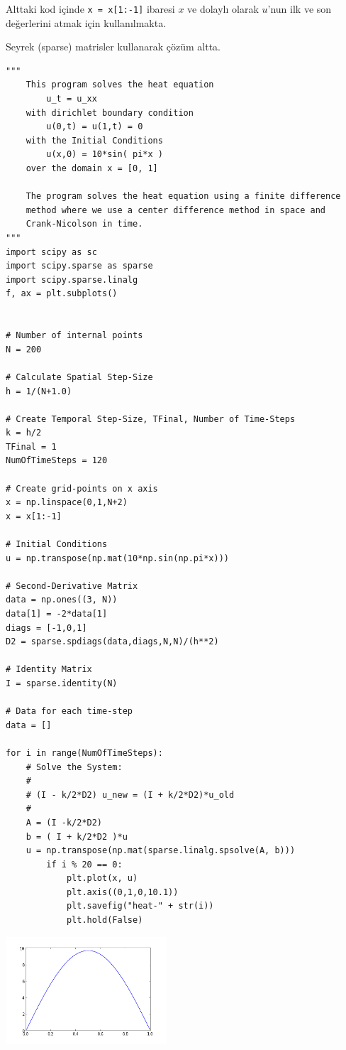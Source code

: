 \documentclass[12pt,fleqn]{article}\usepackage{../../common}
\begin{document}
Alttaki kod içinde \verb!x = x[1:-1]! ibaresi $x$ ve dolaylı
olarak $u$'nun ilk ve son değerlerini atmak için kullanılmakta.

Seyrek (sparse) matrisler kullanarak çözüm altta.

\begin{verbatim}
"""
	This program solves the heat equation
		u_t = u_xx
	with dirichlet boundary condition
		u(0,t) = u(1,t) = 0
	with the Initial Conditions
		u(x,0) = 10*sin( pi*x )
	over the domain x = [0, 1]
 
	The program solves the heat equation using a finite difference
	method where we use a center difference method in space and
	Crank-Nicolson in time.
"""
import scipy as sc
import scipy.sparse as sparse
import scipy.sparse.linalg
f, ax = plt.subplots()

 
# Number of internal points
N = 200
 
# Calculate Spatial Step-Size
h = 1/(N+1.0)
 
# Create Temporal Step-Size, TFinal, Number of Time-Steps
k = h/2
TFinal = 1
NumOfTimeSteps = 120
 
# Create grid-points on x axis
x = np.linspace(0,1,N+2)
x = x[1:-1]

# Initial Conditions
u = np.transpose(np.mat(10*np.sin(np.pi*x)))
 
# Second-Derivative Matrix
data = np.ones((3, N))
data[1] = -2*data[1]
diags = [-1,0,1]
D2 = sparse.spdiags(data,diags,N,N)/(h**2)

# Identity Matrix
I = sparse.identity(N)
 
# Data for each time-step
data = []
 
for i in range(NumOfTimeSteps):
	# Solve the System: 
	#
	# (I - k/2*D2) u_new = (I + k/2*D2)*u_old
	#
	A = (I -k/2*D2)
	b = ( I + k/2*D2 )*u
	u = np.transpose(np.mat(sparse.linalg.spsolve(A, b)))
        if i % 20 == 0:
            plt.plot(x, u)
            plt.axis((0,1,0,10.1))
            plt.savefig("heat-" + str(i))
            plt.hold(False)
\end{verbatim}

\includegraphics[height=4cm]{heat-0.png}
\end{document}
